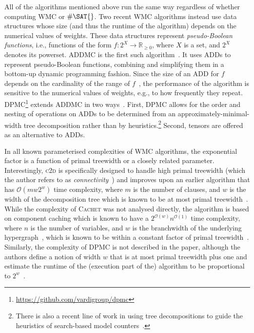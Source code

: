 \documentclass[runningheads]{llncs}
\begin{document}
All of the algorithms mentioned above run the same way regardless of whether
computing \textsf{WMC} or $\#\SAT{}$. Two recent \textsf{WMC} algorithms instead
use data structures whose size (and thus the runtime of the algorithm) depends
on the numerical values of weights. These data structures represent
\emph{pseudo-Boolean functions}, i.e., functions of the form
$f\colon 2^X \to \mathbb{R}_{\ge 0}$, where $X$ is a set, and $2^X$ denotes its
powerset. \textsc{ADDMC} is the first such
algorithm~\cite{DBLP:conf/aaai/DudekPV20}. It uses ADDs to represent
pseudo-Boolean functions, combining and simplifying them in a bottom-up dynamic
programming fashion. Since the size of an ADD for $f$ depends on the cardinality
of the range of $f$~\cite{DBLP:journals/fmsd/BaharFGHMPS97}, the performance of
the algorithm is sensitive to the numerical values of weights, e.g., to how
frequently they repeat.
\textsc{DPMC}\footnote{\url{https://github.com/vardigroup/dpmc}} extends
\textsc{ADDMC} in two ways~\cite{DBLP:conf/cp/DudekPV20}. First, \textsc{DPMC}
allows for the order and nesting of operations on ADDs to be determined from an
approximately-minimal-width tree decomposition rather than by
heuristics.\footnote{There is also a recent line of work in using tree
  decompositions to guide the heuristics of search-based model
  counters~\cite{DBLP:conf/cp/KorhonenJ21}.} Second, tensors are offered as an
alternative to ADDs.

In all known parameterised complexities of \textsf{WMC} algorithms, the
exponential factor is a function of primal treewidth or a closely related
parameter. Interestingly, \textsc{c2d} is specifically designed to handle high
primal treewidth (which the author refers to as
\emph{connectivity}~\cite{DBLP:conf/ijcai/Darwiche99}) and improves upon an
earlier algorithm that has $\mathcal{O}(mw2^w)$ time complexity, where $m$ is
the number of clauses, and $w$ is the width of the decomposition tree which is
known to be at most primal
treewidth~\cite{DBLP:journals/jacm/Darwiche01,DBLP:conf/ecai/Darwiche04}. While
the complexity of \textsc{Cachet} was not analysed directly, the algorithm is
based on component caching which is known to have a
$2^{\mathcal{O}(w)}n^{\mathcal{O}(1)}$ time complexity, where $n$ is the number
of variables, and $w$ is the branchwidth of the underlying
hypergraph~\cite{DBLP:journals/jair/BacchusDP09,DBLP:conf/sat/SangBBKP04}, which
is known to be within a constant factor of primal
treewidth~\cite{DBLP:journals/jct/RobertsonS91}. Similarly, the complexity of
\textsf{DPMC} is not described in the paper, although the authors define a
notion of width $w$ that is at most primal treewidth plus one and estimate the
runtime of the (execution part of the) algorithm to be proportional to
$2^w$~\cite{DBLP:conf/cp/DudekPV20}.
\end{document}
